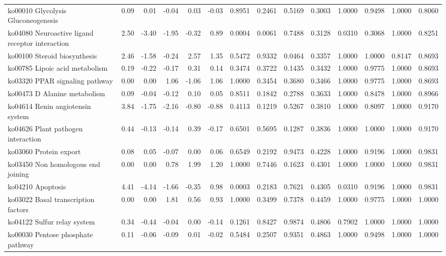 {\begin{landscape}
\begin{longtable}{ | l | r | r | r | r | r | r  | r | r | r | r | r | r  | r  |}
			ko00010  Glycolysis Gluconeogenesis & 0.09 & 0.01 & -0.04 & 0.03 & -0.03 & 0.8951 & 0.2461 & 0.5169 & 0.3003 & 1.0000 & 0.9498 & 1.0000 & 0.8060 \\ 
			ko04080  Neuroactive ligand receptor interaction & 2.50 & -3.40 & -1.95 & -0.32 & 0.89 & 0.0004 & 0.0061 & 0.7488 & 0.3128 & 0.0310 & 0.3068 & 1.0000 & 0.8251 \\ 
			ko00100  Steroid biosynthesis & 2.46 & -1.58 & -0.24 & 2.57 & 1.35 & 0.5472 & 0.9332 & 0.0464 & 0.3357 & 1.0000 & 1.0000 & 0.8147 & 0.8693 \\ 
			ko00785  Lipoic acid metabolism & 0.19 & -0.22 & -0.17 & 0.31 & 0.14 & 0.3474 & 0.3722 & 0.1435 & 0.3432 & 1.0000 & 0.9775 & 1.0000 & 0.8693 \\ 
			ko03320  PPAR signaling pathway & 0.00 & 0.00 & 1.06 & -1.06 & 1.06 & 1.0000 & 0.3454 & 0.3680 & 0.3466 & 1.0000 & 0.9775 & 1.0000 & 0.8693 \\ 
			ko00473  D Alanine metabolism & 0.09 & -0.04 & -0.12 & 0.10 & 0.05 & 0.8511 & 0.1842 & 0.2788 & 0.3633 & 1.0000 & 0.8478 & 1.0000 & 0.8966 \\ 
			ko04614  Renin angiotensin system & 3.84 & -1.75 & -2.16 & -0.80 & -0.88 & 0.4113 & 0.1219 & 0.5267 & 0.3810 & 1.0000 & 0.8097 & 1.0000 & 0.9170 \\ 
			ko04626  Plant pathogen interaction & 0.44 & -0.13 & -0.14 & 0.39 & -0.17 & 0.6501 & 0.5695 & 0.1287 & 0.3836 & 1.0000 & 1.0000 & 1.0000 & 0.9170 \\ 
			ko03060  Protein export & 0.08 & 0.05 & -0.07 & 0.00 & 0.06 & 0.6549 & 0.2192 & 0.9473 & 0.4228 & 1.0000 & 0.9196 & 1.0000 & 0.9831 \\ 
			ko03450  Non homologous end joining & 0.00 & 0.00 & 0.78 & 1.99 & 1.20 & 1.0000 & 0.7446 & 0.1623 & 0.4301 & 1.0000 & 1.0000 & 1.0000 & 0.9831 \\ 
			ko04210  Apoptosis & 4.41 & -4.14 & -1.66 & -0.35 & 0.98 & 0.0003 & 0.2183 & 0.7621 & 0.4305 & 0.0310 & 0.9196 & 1.0000 & 0.9831 \\ 
			ko03022  Basal transcription factors & 0.00 & 0.00 & 1.81 & 0.56 & 0.93 & 1.0000 & 0.3499 & 0.7378 & 0.4459 & 1.0000 & 0.9775 & 1.0000 & 1.0000 \\ 
			ko04122  Sulfur relay system & 0.34 & -0.44 & -0.04 & 0.00 & -0.14 & 0.1261 & 0.8427 & 0.9874 & 0.4806 & 0.7902 & 1.0000 & 1.0000 & 1.0000 \\ 
			ko00030  Pentose phosphate pathway & 0.11 & -0.06 & -0.09 & 0.01 & -0.02 & 0.5484 & 0.2507 & 0.9351 & 0.4863 & 1.0000 & 0.9498 & 1.0000 & 1.0000 \\ 

\end{longtable}
\end{landscape}}
